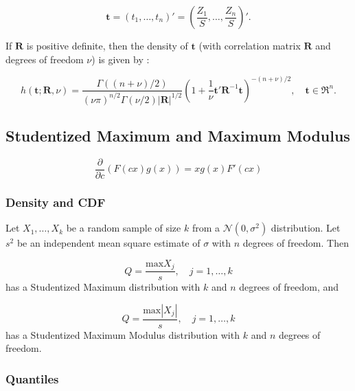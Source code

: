 \begin{equation}
	\boldsymbol{t} = (t_1,\ldots,t_n)' = \left(\frac{Z_1}{S},\ldots,\frac{Z_n}{S}\right)' .
\end{equation}




If $\boldsymbol{R}$ is positive definite, then the density of $\boldsymbol{t}$ (with correlation matrix $\boldsymbol{R}$ and degrees of freedom $\nu$) is given by \citep{Tong_1990}:

\begin{equation}
	h(\boldsymbol{t; R}, \nu)= \frac{\Gamma((n+\nu)/2)}{(\nu \pi)^{n/2} \Gamma(\nu/2) \vert \boldsymbol{R}  \vert^{1/2}} \left(1+\frac{1}{\nu} \boldsymbol{t}' \boldsymbol{R}^{-1} \boldsymbol{t} \right)^{-(n+\nu)/2} , \quad \boldsymbol{t} \in \Re^n.
\end{equation}



\subsection{Studentized Maximum and Maximum Modulus}

\begin{equation}
	\frac{\partial}{\partial c} \left(F(c x) g(x)\right) = x g(x) F'(c x)
\end{equation}



\subsubsection{Density and CDF}
Let $X_1,\ldots,X_k$ be a random sample of size $k$ from a $\mathcal{N}(0,\sigma^2)$ distribution. Let $s^2$ be an independent mean square estimate of $\sigma$ with $n$ degrees of freedom. Then 

\begin{equation}
	Q=\frac{\text{max}X_j}{s}, \quad j=1,\ldots,k
\end{equation}
has a Studentized Maximum distribution with $k$ and $n$ degrees of freedom, and

\begin{equation}
	Q=\frac{\text{max}|X_j|}{s}, \quad j=1,\ldots,k
\end{equation}
has a Studentized Maximum Modulus distribution with $k$ and $n$ degrees of freedom.




\subsubsection{Quantiles}

